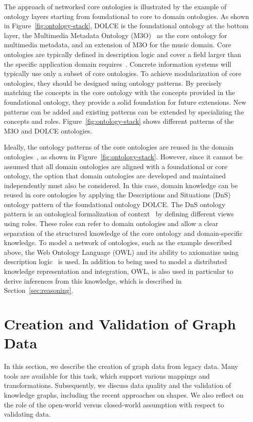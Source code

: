 \documentclass[a4paper,USenglish]{tgdk-v2021}
\begin{document}
The approach of networked core ontologies is illustrated by the example of ontology layers starting from foundational to core to domain ontologies.
As shown in Figure~\ref{fig:ontology-stack}, DOLCE is the foundational ontology at the bottom layer, the Multimedia Metadata Ontology (M3O)~\cite{www-m3o} as the core ontology for multimedia metadata, and an extension of M3O for the music domain.
Core ontologies are typically defined in description logic and cover a field larger than the specific application domain requires~\cite{GangemiPresuttiODP2009}. 
Concrete information systems will typically use only a subset of core ontologies.
To achieve modularization of core ontologies, they should be designed using ontology patterns.
By precisely matching the concepts in the core ontology with the concepts provided in the foundational ontology, they provide a solid foundation for future extensions.
New patterns can be added and existing patterns can be extended by specializing the concepts and roles.
Figure~\ref{fig:ontology-stack} shows different patterns of the M3O and DOLCE ontologies.

Ideally, the ontology patterns of the core ontologies are reused in the domain ontologies~\cite{GangemiPresuttiODP2009}, as shown in Figure~\ref{fig:ontology-stack}.
However, since it cannot be assumed that all domain ontologies are aligned with a foundational or core ontology, the option that domain ontologies are developed and maintained independently must also be considered.
In this case, domain knowledge can be reused in core ontologies by applying the Descriptions and Situations (DnS) ontology pattern of the foundational ontology DOLCE.
The DnS ontology pattern is an ontological formalization of context~\cite{OberleMiddleware2006} by defining different views using roles.
These roles can refer to domain ontologies and allow a clear separation of the structured knowledge of the core ontology and domain-specific knowledge.
To model a network of ontologies, such as the example described above, the Web Ontology Language (OWL) and its ability to axiomatize using description logic~\cite{DBLP:conf/dlog/2003handbook} is used.
In addition to being used to model a distributed knowledge representation and integration, OWL, is also used in particular to derive inferences from this knowledge, which is described in Section~\ref{sec:reasoning}.

\section{Creation and Validation of Graph Data}
\label{sec:creation}
In this section, we describe the creation of graph data from legacy data. 
Many tools are available for this task, which support various mappings and transformations.
Subsequently, we discuss data quality and the validation of knowledge graphs, including the recent approaches on shapes.
We also reflect on the role of the open-world versus closed-world assumption with respect to validating data.
\end{document}
